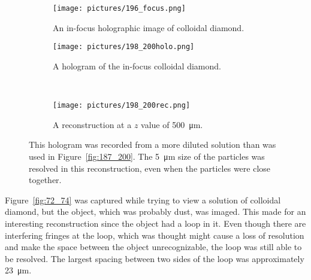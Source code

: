 \clearpage


\begin{figure}[ht!]
    \begin{center}

        \begin{subfigure}[t]{0.4\textwidth}
            \label{fig:196_focus}
            \texttt{[image: pictures/196\_focus.png]}
            \caption{An in-focus holographic image of colloidal diamond.}
        \end{subfigure}
                \hspace*{\fill}
        \begin{subfigure}[t]{0.4\textwidth}
            \label{fig:198_200holo}
            \texttt{[image: pictures/198\_200holo.png]}
            \caption{A hologram of the in-focus colloidal diamond.}
        \end{subfigure}
        \\
        \begin{subfigure}[t]{\textwidth}
            \label{fig:198_200rec}
            \texttt{[image: pictures/198\_200rec.png]}
            \caption{A reconstruction at a $z$ value of \SI{500}{\micro\meter}.}
        \end{subfigure}


    \end{center}
    \caption{%
        This hologram was recorded from a more diluted solution than was used
        in
        Figure~\ref{fig:187_200}.
        The \SI{5}{\micro\meter} size of the
        particles was resolved in this reconstruction, even when the particles
        were close together.
    }%
    \label{fig:198_200}
\end{figure}



Figure~\ref{fig:72_74} was captured while trying to view a solution of
colloidal diamond, but the object, which was probably dust, was imaged. This made
for an interesting reconstruction since the object had a loop in it. Even
though there are interfering fringes at the loop, which was thought might cause
a loss of resolution and make the space between the object
unrecognizable, the loop was still able to be resolved. The largest spacing
between two sides of the loop was approximately \SI{23}{\micro\meter}.

